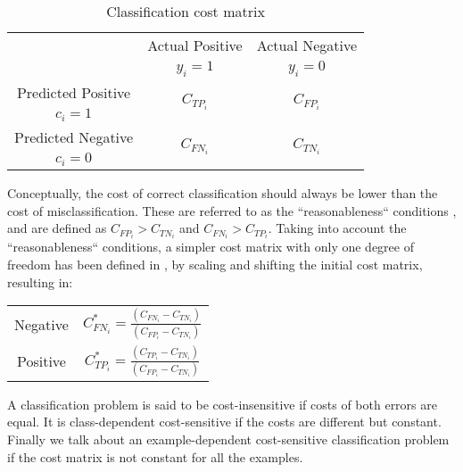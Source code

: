   \begin{table}[t]
    \centering
    \footnotesize
    \begin{tabular}{c|c|c}
      \multicolumn{1}{c|}{}  & Actual Positive& Actual Negative \\
      \multicolumn{1}{c|}{} & $y_i=1$& $y_i=0$ \\
      \hline
      Predicted Positive    & \multirow{ 2}{*}{$C_{TP_i}$} & \multirow{ 2}{*}{$C_{FP_i}$} \\
      $c_i=1$ & &\\
      \hline
      Predicted Negative    & \multirow{ 2}{*}{$C_{FN_i}$} & \multirow{ 2}{*}{$C_{TN_i}$} \\
      $c_i=0$ & &\\
    \end{tabular}
    \caption{Classification cost matrix}
    \label{tab:2:cost_matrix}
  \end{table}  

  Conceptually, the cost of correct classification should always be lower than the cost of 
  misclassification. These are referred to as the ``reasonableness`` conditions \citep{Elkan2001}, 
  and are defined as  $C_{FP_i} > C_{TN_i}$ and $C_{FN_i} > C_{TP_i}$.
  Taking into account the ``reasonableness`` conditions, a simpler cost matrix 
  with only one degree of freedom has been defined in \citep{Elkan2001},
  by scaling and shifting the initial cost matrix, resulting in:
  \begin{center}
    \footnotesize
    \begin{tabular}{c|c}
    \multirow{ 2}{*}{Negative} & \multirow{ 
    2}{*}{$C^*_{FN_i}=\frac{(C_{FN_i}-C_{TN_i})}{(C_{FP_i}-C_{TN_i})}$} \\
    \\
    \hline
    \multirow{ 2}{*}{Positive} & \multirow{ 
    2}{*}{$C^*_{TP_i}=\frac{(C_{TP_i}-C_{TN_i})}{(C_{FP_i}-C_{TN_i})}$} \\
    \\ 
    \end{tabular}
  \end{center}

  A classification problem is said to be cost-insensitive if costs of both errors are equal. It 
  is class-dependent cost-sensitive if the costs are different but constant. Finally we talk 
  about an example-dependent cost-sensitive classification problem if the cost matrix is not 
  constant for all the examples.

